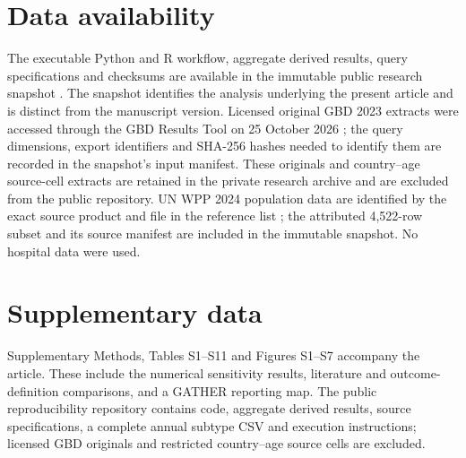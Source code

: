 \documentclass[11pt,a4paper]{article}
\begin{document}
\section*{Data availability}
The executable Python and R workflow, aggregate derived results, query specifications and checksums are available in the immutable public research snapshot \citep{repository}. The snapshot identifies the analysis underlying the present article and is distinct from the manuscript version. Licensed original GBD 2023 extracts were accessed through the GBD Results Tool on 25 October 2026 \citep{results}; the query dimensions, export identifiers and SHA-256 hashes needed to identify them are recorded in the snapshot's input manifest. These originals and country--age source-cell extracts are retained in the private research archive and are excluded from the public repository. UN WPP 2024 population data are identified by the exact source product and file in the reference list \citep{wpp2024}; the attributed 4,522-row subset and its source manifest are included in the immutable snapshot. No hospital data were used.

{\color{blue} \section*{Supplementary data}
Supplementary Methods, Tables S1--S11 and Figures S1--S7 accompany the article. These include the numerical sensitivity results, literature and outcome-definition comparisons, and a GATHER reporting map. The public reproducibility repository contains code, aggregate derived results, source specifications, a complete annual subtype CSV and execution instructions; licensed GBD originals and restricted country--age source cells are excluded.}
\end{document}
